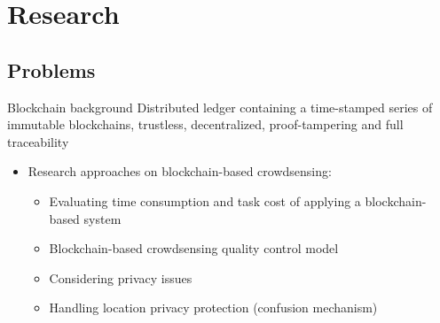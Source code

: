 

\section{Research}

\subsection{Problems}

\begin{frame}{Blockchain background}
  \alert{Distributed ledger containing a time-stamped series of immutable blockchains, trustless, decentralized, proof-tampering and full traceability}
  \begin{itemize}
    \item Research approaches on blockchain-based crowdsensing:
          \begin{itemize}
            \item Evaluating time consumption and task cost of applying a blockchain-based system\cite{paper33}
            \item Blockchain-based crowdsensing quality control model\cite{paper34}
            \item Considering privacy issues\cite{paper35}
            \item Handling location privacy protection\cite{paper37} (confusion mechanism)
          \end{itemize}
  \end{itemize}
\end{frame}

